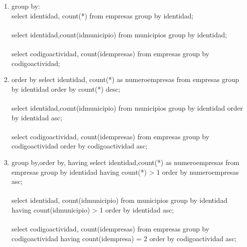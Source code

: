 \documentclass[10pt]{article}         %
\begin{document}
\begin{enumerate}
\item
group by:\\
select identidad, count(*) from empresas group by identidad;\\
\\
select identidad,count(idmunicipio) from municipios group by identidad;\\
\\
select codigoactividad, count(idempresas) from empresas group by codigoactividad;


\item
order by
select identidad, count(*) as numeroempresas from empresas group by identidad order by count(*) desc;\\
\\
select identidad,count(idmunicipio) from municipios group by identidad order by identidad asc;\\
\\
select codigoactividad, count(idempresas) from empresas group by codigoactividad order by codigoactividad asc;

\item 
group by,order by, having
select identidad,count(*) as numeroempresas from empresas group by identidad having count(*) > 1 order by numeroempresas asc;\\
\\
select identidad, count(idmunicipio) from municipios group by identidad having count(idmunicipio) > 1 order by identidad asc;\\
\\
select codigoactividad, count(idempresas) from empresas group by codigoactividad having count(idempresa) = 2 order by codigoactividad asc;

\end{enumerate}
\end{document}
